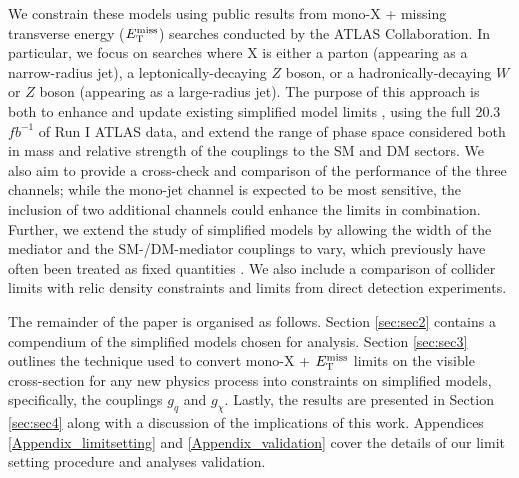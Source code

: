 We constrain these models using public results from mono-X + missing transverse energy ($E_{\mathrm{T}}^{\mathrm{miss}}$) searches conducted by the ATLAS Collaboration. In particular, we focus on searches where X is either a parton (appearing as a narrow-radius jet), a leptonically-decaying $Z$ boson, or a hadronically-decaying $W$ or $Z$ boson (appearing as a large-radius jet). The purpose of this approach is both to enhance and update existing simplified model limits \cite{}, using the full 20.3 $fb^{-1}$ of Run I ATLAS data, and extend the range of phase space considered both in mass and relative strength of the couplings to the SM and DM sectors. We also aim to provide a cross-check and comparison of the performance of the three channels; while the mono-jet channel is expected to be most sensitive, the inclusion of two additional channels could enhance the limits in combination. Further, we extend the study of simplified models by allowing the width of the mediator and the SM-/DM-mediator couplings to vary, which previously have often been treated as fixed quantities \cite{}. We also include a comparison of collider limits with relic density constraints and limits from direct detection experiments.

The remainder of the paper is organised as follows. Section \ref{sec:sec2} contains a compendium of the simplified models chosen for analysis. Section \ref{sec:sec3} outlines the technique used to convert mono-X + $E_{\mathrm{T}}^{\mathrm{miss}}$ limits on the visible cross-section for any new physics process into constraints on simplified models, specifically, the couplings $g_q$ and $g_{\chi}$. Lastly, the results are presented in Section \ref{sec:sec4} along with a discussion of the implications of this work. Appendices \ref{Appendix_limitsetting} and \ref{Appendix_validation} cover the details of our limit setting procedure and analyses validation.

